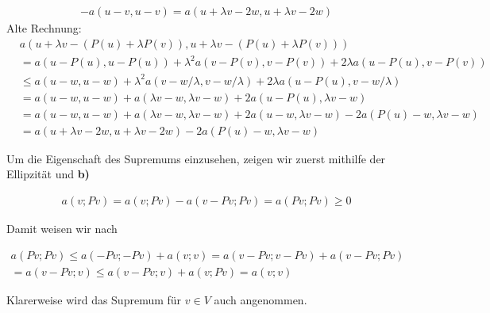 \begin{solution}
\begin{enumerate}[label = \textbf{\alph*)}]
\begin{align*}
      - a(u-v,u-v) = a(u + \lambda v - 2w, u + \lambda v - 2w)
    \end{align*}
    Alte Rechnung:
    \begin{align*}
      &
      a(u + \lambda v - (P(u) + \lambda P(v)), u + \lambda v - (P(u) + \lambda P(v))) \\
      & =
      a(u - P(u), u - P(u))
      +
      \lambda^2 a(v - P(v), v - P(v))
      +
      2 \lambda a(u - P(u), v - P(v)) \\
      & \leq
      a(u - w, u - w)
      +
      \lambda^2 a(v - w / \lambda, v - w / \lambda)
      +
      2 \lambda a(u - P(u), v - w/\lambda) \\
      & =
      a(u - w, u - w)
      +
      a(\lambda v - w, \lambda v - w)
      +
      2 a(u - P(u), \lambda v - w) \\
      &=   a(u - w, u - w)
        +
        a(\lambda v - w, \lambda v - w)
        +
        2 a(u -w, \lambda v - w) - 2a(P(u) -w, \lambda v - w) \\
      &= a(u + \lambda v - 2w, u + \lambda v - 2w) - 2a(P(u) -w, \lambda v - w)
    \end{align*}

  Um die Eigenschaft des Supremums einzusehen, zeigen wir zuerst mithilfe der Ellipzität und \textbf{b)}

  \begin{align*}
    a(v; Pv)
    =
    a(v; Pv) - a(v-Pv; Pv)
    =
    a(Pv; Pv)
    \geq
    0
  \end{align*}

  Damit weisen wir nach

  \begin{multline*}
    a(Pv; Pv)
    \leq
    a(-Pv; -Pv) + a(v; v)
    =
    a(v-Pv; v-Pv) + a(v-Pv; Pv) \\
    =
    a(v-Pv; v)
    \leq
    a(v-Pv; v) + a(v; Pv)
    =
    a(v; v)
  \end{multline*}

  Klarerweise wird das Supremum für $v \in V$ auch angenommen.
\end{enumerate}

\end{solution}

